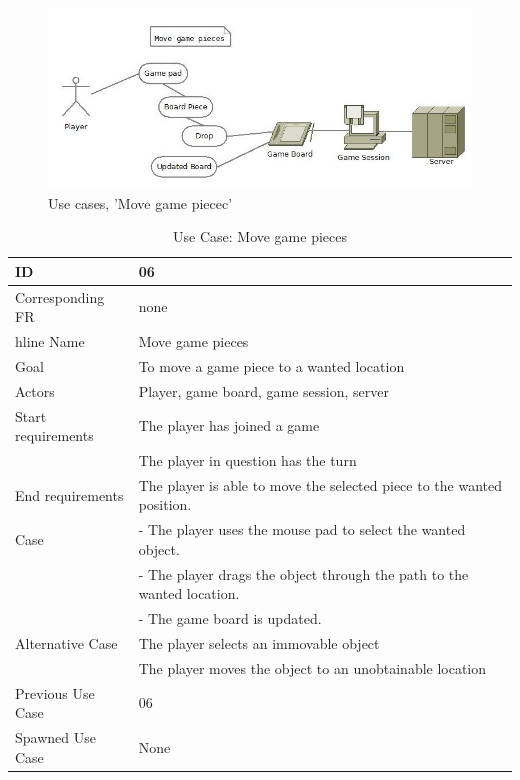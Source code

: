 \begin{figure}[H]
  \centering
    \includegraphics[width=1.0\textwidth]{img/movegamepieces.jpg}
  \caption{Use cases, 'Move game piecec'} 
  \label{fig:movepiece}
\end{figure}


\begin{table}[H]
\begin{tabular}{|l|p{14cm}|}
\hline
	\textbf{ID} & \textbf{06}\\ \hline
	Corresponding FR & none\\hline
	Name & Move game pieces \\ \hline
	Goal & To move a game piece to a wanted location \\ \hline
	Actors & Player, game board, game session, server \\ \hline
	Start requirements & The player has joined a game \\
				& The player in question has the turn \\ \hline
	End requirements & The player is able to move the selected piece to the wanted position. \\ \hline
	Case & - The player uses the mouse pad to select the wanted object. \\
		& - The player drags the object through the path to the wanted location. \\
		& - The game board is updated. \\ \hline
	Alternative Case & The player selects an immovable object \\
				& The player moves the object to an unobtainable location\\ \hline
	Previous Use Case & 06 \\ \hline
	Spawned Use Case & None\\ \hline
\end{tabular}
\caption{Use Case: Move game pieces}
\label{fig:usecase06table}
\end{table}


